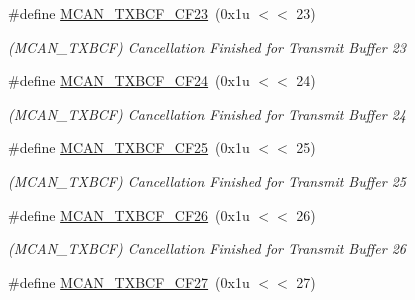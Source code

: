 \begin{DoxyCompactItemize}
\mbox{\label{group__SAME70__MCAN_ga3cee446b6023004524960d98455a8bcd}} 
\#define \mbox{\hyperlink{group__SAME70__MCAN_ga3cee446b6023004524960d98455a8bcd}{M\+C\+A\+N\+\_\+\+T\+X\+B\+C\+F\+\_\+\+C\+F23}}~(0x1u $<$$<$ 23)
\begin{DoxyCompactList}\small\item\em (M\+C\+A\+N\+\_\+\+T\+X\+B\+CF) Cancellation Finished for Transmit Buffer 23 \end{DoxyCompactList}\item 
\mbox{\label{group__SAME70__MCAN_ga926da8dfe296ea087151c03dcf550fcb}} 
\#define \mbox{\hyperlink{group__SAME70__MCAN_ga926da8dfe296ea087151c03dcf550fcb}{M\+C\+A\+N\+\_\+\+T\+X\+B\+C\+F\+\_\+\+C\+F24}}~(0x1u $<$$<$ 24)
\begin{DoxyCompactList}\small\item\em (M\+C\+A\+N\+\_\+\+T\+X\+B\+CF) Cancellation Finished for Transmit Buffer 24 \end{DoxyCompactList}\item 
\mbox{\label{group__SAME70__MCAN_gaa086abcfbd832e58e06b251b4cabfddd}} 
\#define \mbox{\hyperlink{group__SAME70__MCAN_gaa086abcfbd832e58e06b251b4cabfddd}{M\+C\+A\+N\+\_\+\+T\+X\+B\+C\+F\+\_\+\+C\+F25}}~(0x1u $<$$<$ 25)
\begin{DoxyCompactList}\small\item\em (M\+C\+A\+N\+\_\+\+T\+X\+B\+CF) Cancellation Finished for Transmit Buffer 25 \end{DoxyCompactList}\item 
\mbox{\label{group__SAME70__MCAN_ga77c10eb2eaacb3a355a731bc8a30d3f1}} 
\#define \mbox{\hyperlink{group__SAME70__MCAN_ga77c10eb2eaacb3a355a731bc8a30d3f1}{M\+C\+A\+N\+\_\+\+T\+X\+B\+C\+F\+\_\+\+C\+F26}}~(0x1u $<$$<$ 26)
\begin{DoxyCompactList}\small\item\em (M\+C\+A\+N\+\_\+\+T\+X\+B\+CF) Cancellation Finished for Transmit Buffer 26 \end{DoxyCompactList}\item 
\mbox{\label{group__SAME70__MCAN_ga3c40d762aebf42c0543a733b3c22a836}} 
\#define \mbox{\hyperlink{group__SAME70__MCAN_ga3c40d762aebf42c0543a733b3c22a836}{M\+C\+A\+N\+\_\+\+T\+X\+B\+C\+F\+\_\+\+C\+F27}}~(0x1u $<$$<$ 27)
$$
\end{DoxyCompactItemize}
